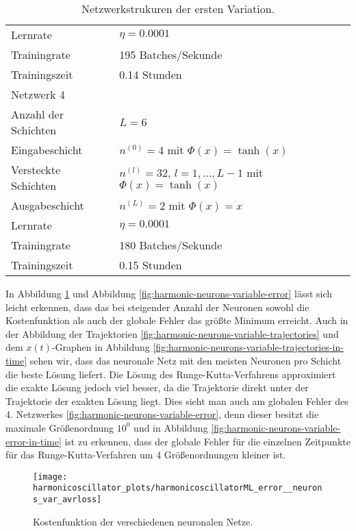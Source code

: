 \begin{table}
\begin{tabular}{ l | l }
              Lernrate & $\eta=0.0001$ \\
              Trainingrate & 195 Batches/Sekunde \\
              Trainingszeit & 0.14 Stunden \\
              \hline
              Netzwerk 4 & \\
              \hline
              Anzahl der Schichten & $L=6$ \\
              Eingabeschicht & $n^{(0)}=4$ mit $\Phi(x)=\tanh(x)$ \\
              Versteckte Schichten & $n^{(l)}=32$, $l = 1, \dots, L-1$ mit $\Phi(x)=\tanh(x)$ \\
              Ausgabeschicht & $n^{(L)}=2$ mit $\Phi(x)=x$ \\
              Lernrate & $\eta=0.0001$ \\
              Trainingrate & 180 Batches/Sekunde \\
              Trainingszeit & 0.15 Stunden \\
              \hline
       \end{tabular}
       \caption{Netzwerkstrukuren der ersten Variation.}
       \label{stiff-table-first}
\end{table}
In Abbildung \ref{fig:harmonic-neurons-variable-loss} und Abbildung \ref{fig:harmonic-neurons-variable-error} lässt
sich leicht erkennen, dass das bei steigender Anzahl der Neuronen sowohl die Kostenfunktion als auch der globale Fehler
das größte Minimum erreicht. Auch in der Abbildung der Trajektorien \ref{fig:harmonic-neurons-variable-trajectories}
und dem $x(t)$-Graphen in Abbildung \ref{fig:harmonic-neurons-variable-trajectories-in-time}
sehen wir, dass das neuronale Netz mit den meisten Neuronen pro Schicht die beste Lösung liefert. Die Lösung des
Runge-Kutta-Verfahrens approximiert die exakte Lösung jedoch viel besser, da die Trajektorie direkt unter der
Trajektorie der exakten Lösung liegt. Dies sieht man auch am globalen Fehler des 4. Netzwerkes
\ref{fig:harmonic-neurons-variable-error}, denn dieser besitzt die maximale Größenordnung $10^0$ und in
Abbildung \ref{fig:harmonic-neurons-variable-error-in-time} ist zu erkennen, dass der globale Fehler für die einzelnen
Zeitpunkte für das Runge-Kutta-Verfahren um $4$ Größenordnungen kleiner ist.
\begin{figure}
       \centering
       \texttt{[image: harmonicoscillator\_plots/harmonicoscillatorML\_error\_\_neurons\_var\_avrloss]}
       \caption{Kostenfunktion der verschiedenen neuronalen Netze.}
       \label{fig:harmonic-neurons-variable-loss}
\end{figure}
